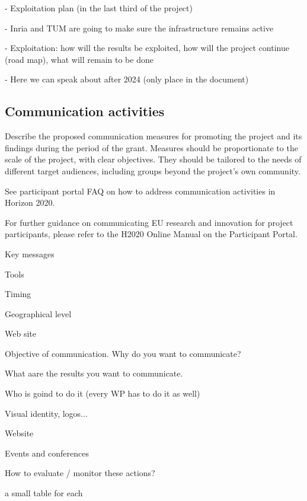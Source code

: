 - Exploitation plan (in the last third of the project)

- Inria and TUM are going to make sure the infrastructure remains active

- Exploitation: how will the results be exploited, how will the project
continue (road map), what will remain to be done

- Here we can speak about after 2024 (only place in the document)

\subsection{Communication activities}


\begin{todo}{}\color{red}
  Describe the proposed communication measures for promoting the project and its findings during the period of the grant. Measures should be proportionate to the scale of the project, with clear objectives.  They should be tailored to the needs of different target audiences, including groups beyond the project's own community.

  See participant portal FAQ on how to address communication activities in Horizon 2020.

  For further guidance on communicating EU research and innovation for project participants, please refer to the H2020 Online Manual on the Participant Portal.
\end{todo}

Key messages

Tools

Timing

Geographical level

Web site

Objective of communication. Why do you want to communicate?

What aare the results you want to communicate.

Who is goind to do it (every WP has to do it as well)

Visual identity, logos...

Website

Events and conferences

How to evaluate / monitor these actions?

{\color{red} a small table for each}


